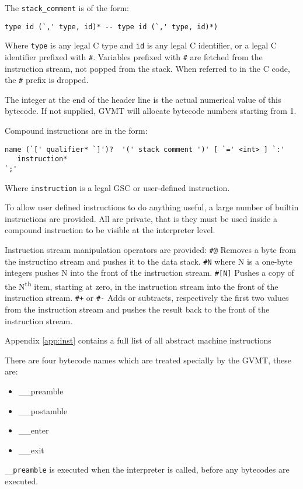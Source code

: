 The \verb|stack_comment| is of the form:
 \begin{verbatim}
type id (`,' type, id)* -- type id (`,' type, id)*)
\end{verbatim}

Where \verb|type| is any legal C type and \verb|id| is any legal C identifier, or a legal C identifier prefixed with \verb|#|. Variables prefixed with \verb|#| are fetched from the instruction stream, not popped from the stack. When referred to in the C code, the \verb|#| prefix is dropped.

The integer at the end of the header line is the actual numerical value of this bytecode. If not supplied, GVMT will allocate bytecode numbers starting from 1.

Compound instructions are in the form:
\begin{verbatim}
name (`[' qualifier* `]')?  '(' stack comment ')' [ `=' <int> ] `:'
   instruction*
`;'
\end{verbatim}

Where \verb|instruction| is a legal GSC or user-defined instruction.

To allow user defined instructions to do anything useful, a large number of builtin instructions are provided. All are private, that is they must be used inside a compound instruction to be visible at the interpreter level. 

Instruction stream manipulation operators are provided:
\verb|#@| Removes a byte from the instructino stream and pushes it to the data stack.
\verb|#N| where N is a one-byte integers pushes N into the front of the instruction stream.
\verb|#[N]| Pushes a copy of the N\textsuperscript{th} item, starting at zero, in the instruction stream into the front of the instruction stream.
\verb|#+| or \verb|#-| Adds or subtracts, respectively the first two values from the instruction stream  and pushes the result back to the front of the instruction stream.

Appendix \ref{app:inst} contains a full list of all abstract machine instructions 

There are four bytecode names which are treated specially by the GVMT, these are:
\begin{itemize}
\item \_\_preamble 
\item \_\_postamble
\item \_\_enter
\item \_\_exit
\end{itemize}
\verb|__preamble| is executed when the interpreter is called, before any bytecodes are executed.

